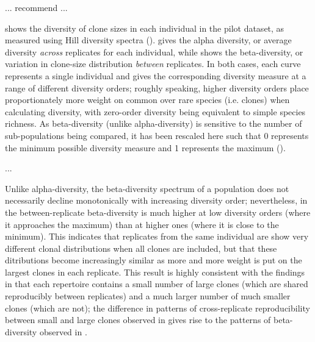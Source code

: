 ... recommend ... %

 shows the diversity of clone sizes in each individual in the pilot dataset, as measured using Hill diversity spectra (). %
 gives the alpha diversity, or average diversity \textit{across} replicates for each individual, while  shows the beta-diversity, or variation in clone-size distribution \textit{between} replicates. In both cases, each curve represents a single individual and gives the corresponding diversity measure at a range of different diversity orders; roughly speaking, higher diversity orders place proportionately more weight on common over rare species (i.e. clones) when calculating diversity, with zero-order diversity being equivalent to simple species richness. As beta-diversity (unlike alpha-diversity) is sensitive to the number of sub-populations being compared, it has been rescaled here such that 0 represents the minimum possible diversity measure and 1 represents the maximum (). %

... %

Unlike alpha-diversity, the beta-diversity spectrum of a population does not necessarily decline monotonically with increasing diversity order; nevertheless, in  the between-replicate beta-diversity is much higher at low diversity orders (where it approaches the maximum) than at higher ones (where it is close to the minimum). This indicates that replicates from the same individual are show very different clonal distributions when all clones are included, but that these ditributions become increasingly similar as more and more weight is put on the largest clones in each replicate. This result is highly consistent with the findings in  that each repertoire contains a small number of large clones (which are shared reproducibly between replicates) and a much larger number of much smaller clones (which are not); the difference in patterns of cross-replicate reproducibility between small and large clones observed in  gives rise to the patterns of beta-diversity observed in .

